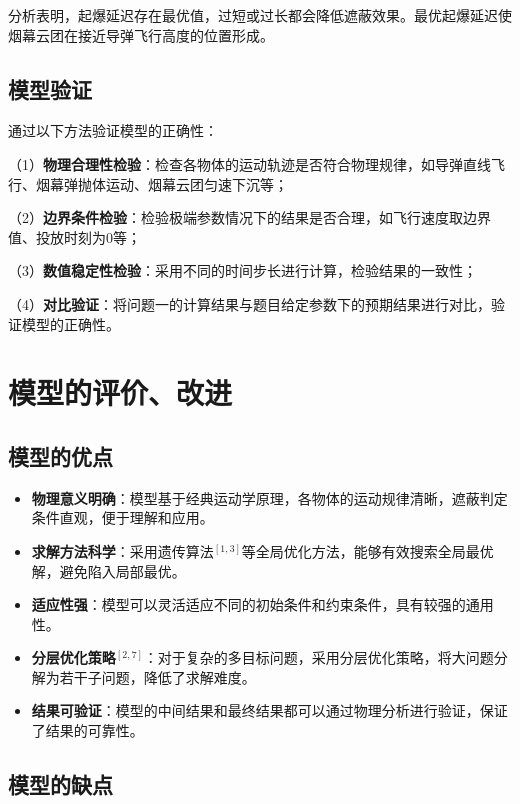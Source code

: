 \documentclass[12pt,a4paper]{article}
\begin{document}
\indent 分析表明，起爆延迟存在最优值，过短或过长都会降低遮蔽效果。最优起爆延迟使烟幕云团在接近导弹飞行高度的位置形成。

\subsection{模型验证}

\indent 通过以下方法验证模型的正确性：

\indent （1）\textbf{物理合理性检验}：检查各物体的运动轨迹是否符合物理规律，如导弹直线飞行、烟幕弹抛体运动、烟幕云团匀速下沉等；

\indent （2）\textbf{边界条件检验}：检验极端参数情况下的结果是否合理，如飞行速度取边界值、投放时刻为0等；

\indent （3）\textbf{数值稳定性检验}：采用不同的时间步长进行计算，检验结果的一致性；

\indent （4）\textbf{对比验证}：将问题一的计算结果与题目给定参数下的预期结果进行对比，验证模型的正确性。


\section{模型的评价、改进}

\subsection{模型的优点}

\begin{itemize}
\item \textbf{物理意义明确}：模型基于经典运动学原理，各物体的运动规律清晰，遮蔽判定条件直观，便于理解和应用。

\item \textbf{求解方法科学}：采用遗传算法$^{[1,3]}$等全局优化方法，能够有效搜索全局最优解，避免陷入局部最优。

\item \textbf{适应性强}：模型可以灵活适应不同的初始条件和约束条件，具有较强的通用性。

\item \textbf{分层优化策略}$^{[2,7]}$：对于复杂的多目标问题，采用分层优化策略，将大问题分解为若干子问题，降低了求解难度。

\item \textbf{结果可验证}：模型的中间结果和最终结果都可以通过物理分析进行验证，保证了结果的可靠性。
\end{itemize}

\subsection{模型的缺点}
\end{document}
